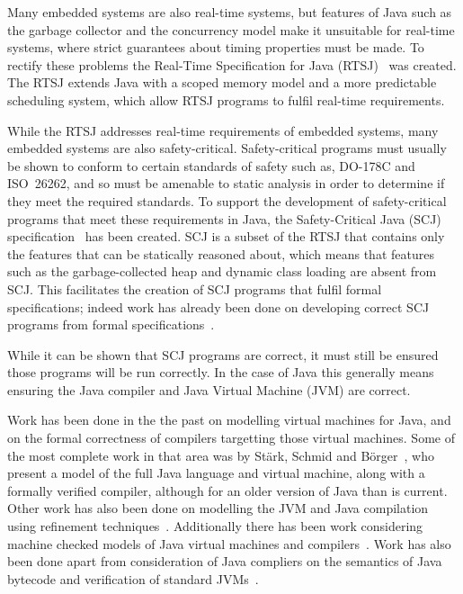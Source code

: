 \documentclass[a4paper,10pt]{article}
\begin{document}
Many embedded systems are also real-time systems, but features of Java such as
the garbage collector and the concurrency model make it unsuitable for real-time
systems, where strict guarantees about timing properties must be made.  To
rectify these problems the Real-Time Specification for Java
(RTSJ)~\cite{gosling2000} was created.  The RTSJ extends Java with a scoped
memory model and a more predictable scheduling system, which allow RTSJ programs
to fulfil real-time requirements.

While the RTSJ addresses real-time requirements of embedded systems, many
embedded systems are also safety-critical.  Safety-critical programs must
usually be shown to conform to certain standards of safety such as,
\mbox{DO-178C} and ISO~26262, and so must be amenable to static analysis in
order to determine if they meet the required standards.  To support the
development of safety-critical programs that meet these requirements in Java,
the Safety-Critical Java (SCJ) specification~\cite{locke2013} has been created.
SCJ is a subset of the RTSJ that contains only the features that can be
statically reasoned about, which means that features such as the
garbage-collected heap and dynamic class loading are absent from SCJ.  This
facilitates the creation of SCJ programs that fulfil formal specifications;
indeed work has already been done on developing correct SCJ programs from formal
specifications~\cite{cavalcanti2011, cavalcanti2013}.

While it can be shown that SCJ programs are correct, it must still be ensured
those programs will be run correctly.  In the case of Java this generally means
ensuring the Java compiler and Java Virtual Machine (JVM) are correct. 

Work has been done in the the past on modelling virtual machines for Java, and
on the formal correctness of compilers targetting those virtual machines.  Some
of the most complete work in that area was by St\"{a}rk, Schmid and
B\"{o}rger~\cite{stark2001}, who present a model of the full Java language and
virtual machine, along with a formally verified compiler, although for an older
version of Java than is current.  Other work has also been done on modelling the
JVM and Java compilation using refinement
techniques~\cite{duran2010}. Additionally there has been work considering
machine checked models of Java virtual machines and
compilers~\cite{lochbihler2012, nipkow2000, strecker2002}. Work has also been
done apart from consideration of Java compliers on the semantics of Java
bytecode and verification of standard JVMs~\cite{bertelsen2000, jones1998}.
\end{document}
